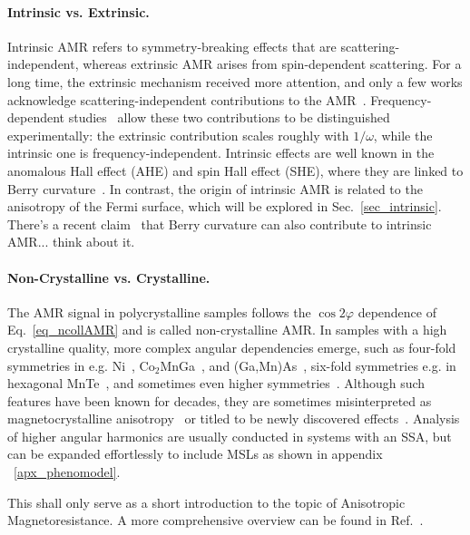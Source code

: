 \documentclass[prb,showpacs,amsmath,amssymb,superscriptaddress,twocolumn,floatfix]{revtex4-1}
\begin{document}
\paragraph{Intrinsic vs. Extrinsic.} Intrinsic AMR refers to symmetry-breaking effects that are scattering-independent, whereas extrinsic AMR arises from spin-dependent scattering. For a long time, the extrinsic mechanism received more attention, and only a few works acknowledge scattering-independent contributions to the AMR~\cite{Kato:2008, Velev:2005, Zeng:2020, Kato:2007, Nadvordnik:2021, Park:2021}. Frequency-dependent studies~\cite{Nadvordnik:2021, Park:2021} allow these two contributions to be distinguished experimentally: the extrinsic contribution scales roughly with $1/\omega$, while the intrinsic one is frequency-independent. Intrinsic effects are well known in the anomalous Hall effect (AHE) and spin Hall effect (SHE), where they are linked to Berry curvature~\cite{Nagaosa:2010, Zhang:2017}. In contrast, the origin of intrinsic AMR is related to the anisotropy of the Fermi surface, which will be explored in Sec.~\ref{sec_intrinsic}.
{\color{red} There's a recent claim~\cite{Dong:2025_a} that Berry curvature
can also contribute to intrinsic AMR... think about it.}

\paragraph{Non-Crystalline vs. Crystalline.} The AMR signal in polycrystalline samples follows the $\cos 2\varphi$ dependence of Eq.~\ref{eq_ncollAMR} and is called non-crystalline AMR. In samples with a high crystalline quality, more complex angular dependencies emerge, such as four-fold symmetries in e.g. Ni~\cite{Doring:1938}, Co$_2$MnGa~\cite{Sato:2019,Ritzinger:2021}, and (Ga,Mn)As~\cite{DeRanieri:2008}, six-fold symmetries e.g. in hexagonal MnTe~\cite{Kriegner:2017, Gonzalez-Betancourt:2024}, and sometimes even higher symmetries~\cite{Gonzalez-Betancourt:2024, NamHai:2012}. Although such features have been known for decades, they are sometimes misinterpreted as magnetocrystalline anisotropy~\cite{Ritzinger:2023} or titled to be newly discovered effects~\cite{Dong:2023}. Analysis of higher angular harmonics are usually conducted in systems with an SSA, but can be expanded effortlessly to include MSLs as shown in appendix ~\ref{apx_phenomodel}.

This shall only serve as a short introduction to the topic of Anisotropic Magnetoresistance. A more comprehensive overview can be found in Ref.~\cite{Ritzinger:2023}.
\end{document}
